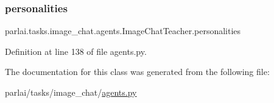 \mbox{\label{classparlai_1_1tasks_1_1image__chat_1_1agents_1_1ImageChatTeacher_a3ba9be694ed33f16d9f3b4c6cc3f6a13}} 
\subsubsection{\texorpdfstring{personalities}{personalities}}
{\footnotesize\ttfamily parlai.\+tasks.\+image\+\_\+chat.\+agents.\+Image\+Chat\+Teacher.\+personalities}



Definition at line 138 of file agents.\+py.



The documentation for this class was generated from the following file\+:\begin{DoxyCompactItemize}
\item 
parlai/tasks/image\+\_\+chat/\hyperlink{parlai_2tasks_2image__chat_2agents_8py}{agents.\+py}\end{DoxyCompactItemize}
